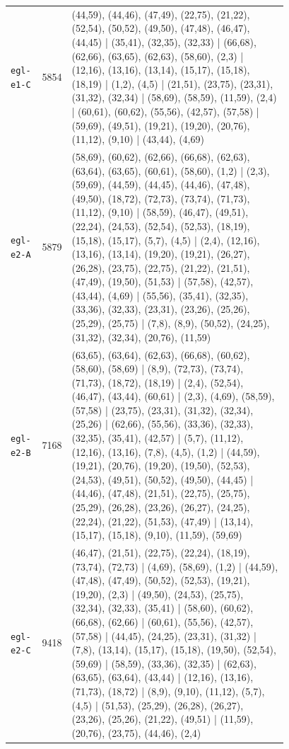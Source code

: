 \begin{landscape}
\begin{longtable}{lr>{\tiny\raggedright\arraybackslash}p{0.78\linewidth}}
\texttt{egl-e1-C} & 5854 & (44,59), (44,46), (47,49), (22,75), (21,22), (52,54), (50,52), (49,50), (47,48), (46,47), (44,45) | (35,41), (32,35), (32,33) | (66,68), (62,66), (63,65), (62,63), (58,60), (2,3) | (12,16), (13,16), (13,14), (15,17), (15,18), (18,19) | (1,2), (4,5) | (21,51), (23,75), (23,31), (31,32), (32,34) | (58,69), (58,59), (11,59), (2,4) | (60,61), (60,62), (55,56), (42,57), (57,58) | (59,69), (49,51), (19,21), (19,20), (20,76), (11,12), (9,10) | (43,44), (4,69) \\[2pt]
\texttt{egl-e2-A} & 5879 & (58,69), (60,62), (62,66), (66,68), (62,63), (63,64), (63,65), (60,61), (58,60), (1,2) | (2,3), (59,69), (44,59), (44,45), (44,46), (47,48), (49,50), (18,72), (72,73), (73,74), (71,73), (11,12), (9,10) | (58,59), (46,47), (49,51), (22,24), (24,53), (52,54), (52,53), (18,19), (15,18), (15,17), (5,7), (4,5) | (2,4), (12,16), (13,16), (13,14), (19,20), (19,21), (26,27), (26,28), (23,75), (22,75), (21,22), (21,51), (47,49), (19,50), (51,53) | (57,58), (42,57), (43,44), (4,69) | (55,56), (35,41), (32,35), (33,36), (32,33), (23,31), (23,26), (25,26), (25,29), (25,75) | (7,8), (8,9), (50,52), (24,25), (31,32), (32,34), (20,76), (11,59) \\[2pt]
\texttt{egl-e2-B} & 7168 & (63,65), (63,64), (62,63), (66,68), (60,62), (58,60), (58,69) | (8,9), (72,73), (73,74), (71,73), (18,72), (18,19) | (2,4), (52,54), (46,47), (43,44), (60,61) | (2,3), (4,69), (58,59), (57,58) | (23,75), (23,31), (31,32), (32,34), (25,26) | (62,66), (55,56), (33,36), (32,33), (32,35), (35,41), (42,57) | (5,7), (11,12), (12,16), (13,16), (7,8), (4,5), (1,2) | (44,59), (19,21), (20,76), (19,20), (19,50), (52,53), (24,53), (49,51), (50,52), (49,50), (44,45) | (44,46), (47,48), (21,51), (22,75), (25,75), (25,29), (26,28), (23,26), (26,27), (24,25), (22,24), (21,22), (51,53), (47,49) | (13,14), (15,17), (15,18), (9,10), (11,59), (59,69) \\[2pt]
\texttt{egl-e2-C} & 9418 & (46,47), (21,51), (22,75), (22,24), (18,19), (73,74), (72,73) | (4,69), (58,69), (1,2) | (44,59), (47,48), (47,49), (50,52), (52,53), (19,21), (19,20), (2,3) | (49,50), (24,53), (25,75), (32,34), (32,33), (35,41) | (58,60), (60,62), (66,68), (62,66) | (60,61), (55,56), (42,57), (57,58) | (44,45), (24,25), (23,31), (31,32) | (7,8), (13,14), (15,17), (15,18), (19,50), (52,54), (59,69) | (58,59), (33,36), (32,35) | (62,63), (63,65), (63,64), (43,44) | (12,16), (13,16), (71,73), (18,72) | (8,9), (9,10), (11,12), (5,7), (4,5) | (51,53), (25,29), (26,28), (26,27), (23,26), (25,26), (21,22), (49,51) | (11,59), (20,76), (23,75), (44,46), (2,4) \\[2pt]

\end{longtable}
\end{landscape}
